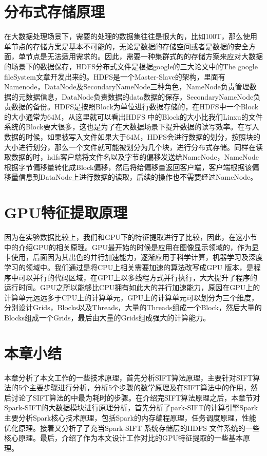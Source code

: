 \section{分布式存储原理}
在大数据处理场景下，需要的处理的数据集往往是很大的，比如100T，那么使用单节点的存储方案是基本不可能的，无论是数据的存储空间或者是数据的安全方面，单节点是无法适用需求的。因此，需要一种集群式的的存储方案来应对大数据的场景下的数据保存，HDFS分布式文件是根据google的三大论文中的The google fileSystem文章开发出来的。HDFS是一个Master-Slave的架构，里面有Namenode，DataNode及SecondaryNameNode三种角色，NameNode负责管理数据的元数据信息，DataNode负责数据的data数据的保存，SecondaryNameNode负责数据的备份。HDFS是按照Block为单位进行数据存储的，在HDFS中一个Block的大小通常为64M，从这里就可以看出HDFS 中的Block的大小比我们Linxu的文件系统的Block要大很多，这也是为了在大数据场景下提升数据的读写效率。在写入数据的时候，如果被写入文件如果大于64M，HDFS会进行数据的划分，按照块的大小进行划分，那么一个文件就可能被划分为几个块，进行分布式存储。同样在读取数据的时，hdfs客户端将文件名以及字节的偏移发送给NameNode，NameNode根据字节偏移量转化成Block偏移，然后将给偏移量返回客户端，客户端根据该偏移量信息到DataNode上进行数据的读取，后续的操作也不需要经过NameNode。
\section{GPU特征提取原理}
因为在实验数据比较上，我们和GPU下的特征提取进行了比较，因此，在这小节中的介绍GPU的相关原理。GPU最开始的时候是应用在图像显示领域的，作为显卡使用，后面因为其出色的并行加速能力，逐渐应用于科学计算，机器学习及深度学习的领域中。我们通过是将CPU上相关需要加速的算法改写成GPU 版本，是程序中可以并行的代码区域，在GPU上以多线程方式并行执行，大大提升了程序的运行时间。GPU之所以能够比CPU拥有如此大的并行加速能力，原因在GPU上的计算单元远远多于CPU上的计算单元，GPU上的计算单元可以划分为三个维度，分别设计Grids，Blocks以及Threads，大量的Threads组成一个Block，然后大量的Blocks组成一个Grids，最后由大量的Grids组成强大的计算能力。
\section{本章小结}
本章分析了本文工作的一些技术原理，首先分析SIFT算法原理，主要针对SIFT算法的5个主要步骤进行分析，分析5个步骤的数学原理及在SIFT算法中的作用，然后讨论了SIFT算法的中最为耗时的步骤。在介绍完SIFT算法原理之后，本章节对Spark-SIFT的大数据模块进行原理分析，首先分析了park-SIFT的计算引擎Spark 主要分析Spark核心技术原理，包括Spark的内存编程原理，任务调度原理，性能优化原理。接着又分析了了充当Spark-SIFT 系统存储层的HDFS 文件系统的一些核心原理。最后，介绍了作为本文设计工作对比的GPU特征提取的一些基本原理。


